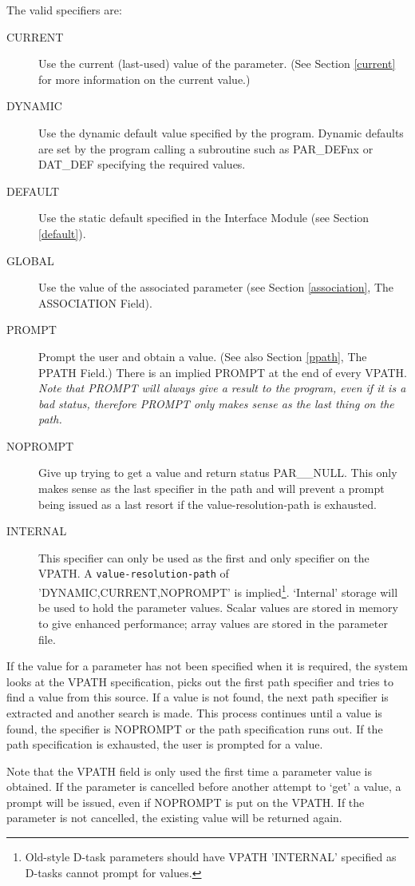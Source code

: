 \documentclass[twoside,11pt,nolof]{starlink}
\begin{document}
The valid specifiers are:
\begin{description}
\item[CURRENT] Use the current (last-used) value of the parameter.
(See Section \ref{current} for more information on the current value.)
\item[DYNAMIC] Use the dynamic default value specified by the program.
Dynamic defaults are set by the program calling a subroutine such as
PAR\_DEFnx or DAT\_DEF specifying the required values.
\item[DEFAULT] Use the static default specified in the Interface Module
(see Section \ref{default}).
\item[GLOBAL] Use the value of the associated parameter (see Section
\ref{association}, The ASSOCIATION Field).
\item[PROMPT]  Prompt the user and obtain a value. (See also Section
\ref{ppath}, The PPATH Field.)
There is an implied PROMPT at the end of every VPATH.
\emph{Note that PROMPT will always give a result to the program, even if it is
a bad status, therefore PROMPT only makes sense as the last thing on the path.}
\item[NOPROMPT] Give up trying to get a value and return status PAR\_\_NULL.
This only makes sense as the last specifier in the path and will prevent a
prompt being issued as a last resort if the value-resolution-path is exhausted.
\item[INTERNAL] This specifier can only be used as the first and only
specifier on the VPATH.
A \texttt{value-resolution-path} of 'DYNAMIC,CURRENT,NOPROMPT' is
implied\footnote{Old-style D-task parameters should have VPATH 'INTERNAL'
specified as D-tasks cannot prompt for values.}.
`Internal' storage will be used to hold the parameter values.
Scalar values are stored in memory to give enhanced performance; array values
are stored in the parameter file.
\end{description}

If the value for a parameter has not been specified when it is required,
the system looks at the VPATH specification, picks out the first path
specifier and tries to find a value from this source.
If a value is not found, the next path
specifier is extracted and another search is made. This process continues
until a value is found, the specifier is NOPROMPT or the path specification
runs out.
If the path specification is exhausted, the user is prompted for a value.

Note that the VPATH field is only used the first time a parameter value is
obtained. If the parameter is cancelled before another attempt to `get' a
value, a prompt will be issued, even if NOPROMPT is put on the VPATH.
If the parameter is not cancelled, the existing value will be returned again.
\end{document}
